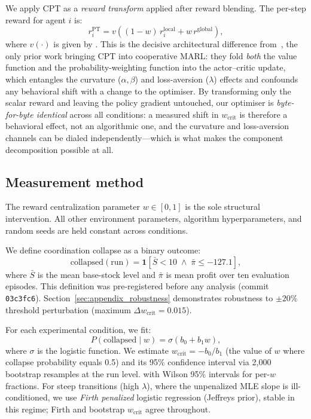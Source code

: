 \documentclass[letterpaper]{article}
\theoremstyle{plain}
\newcommand{\wcrit}{w_{\mathrm{crit}}}
\newcommand{\PT}{\mathrm{PT}}
\begin{document}
We apply CPT as a \emph{reward transform} applied after reward blending.
The per-step reward for agent $i$ is:
\begin{equation}
  r_i^{\PT} = v\!\left((1-w)\,r_i^{\mathrm{local}} + w\,r^{\mathrm{global}}\right),
  \label{eq:reward}
\end{equation}
where $v(\cdot)$ is given by .
This is the decisive architectural difference from~\citet{lalmohammed2025}, the
only prior work bringing CPT into cooperative MARL: they fold \emph{both} the
value function and the probability-weighting function into the actor--critic
update, which entangles the curvature ($\alpha,\beta$) and loss-aversion
($\lambda$) effects and confounds any behavioral shift with a change to the
optimiser. By transforming only the scalar reward and leaving the policy gradient
untouched, our optimiser is \emph{byte-for-byte identical} across all conditions:
a measured shift in $\wcrit$ is therefore a behavioral effect, not an algorithmic
one, and the curvature and loss-aversion channels can be dialed independently---which
is what makes the component decomposition possible at all.

\subsection{Measurement method}
\label{sec:method}

The reward centralization parameter $w \in [0,1]$ is the sole structural
intervention.
All other environment parameters, algorithm hyperparameters, and random
seeds are held constant across conditions.

We define coordination collapse as a binary outcome:
\begin{equation}
  \mathrm{collapsed}(\text{run}) = \mathbf{1}\!\left[
    \bar{S} < 10 \;\wedge\; \bar{\pi} \leq -127.1
  \right],
  \label{eq:collapse}
\end{equation}
where $\bar{S}$ is the mean base-stock level and $\bar{\pi}$ is mean
profit over ten evaluation episodes.
This definition was pre-registered before any analysis (commit
\texttt{03c3fc6}).
Section~\ref{sec:appendix_robustness} demonstrates robustness to $\pm 20\%$
threshold perturbation (maximum $\Delta\wcrit = 0.015$).

For each experimental condition, we fit:
\begin{equation}
  P(\mathrm{collapsed} \mid w) = \sigma(b_0 + b_1 w),
  \label{eq:logistic}
\end{equation}
where $\sigma$ is the logistic function.
We estimate $\wcrit = -b_0/b_1$ (the value of $w$ where collapse
probability equals 0.5) and its 95\% confidence interval via 2,000
bootstrap resamples at the run level.
with Wilson 95\% intervals for per-$w$ fractions. For steep transitions
(high $\lambda$), where the unpenalized MLE slope is ill-conditioned, we use
\emph{Firth penalized} logistic regression (Jeffreys prior), stable in this
regime; Firth and bootstrap $\wcrit$ agree throughout.
\end{document}
